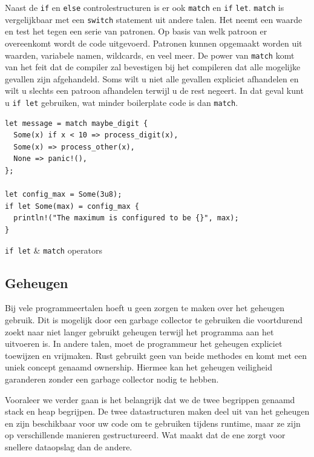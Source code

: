 Naast de \texttt{if} en \texttt{else} controlestructuren is er ook
\texttt{match} en \texttt{if} \texttt{let}. \texttt{match}
is vergelijkbaar met een \texttt{switch} statement uit andere talen. Het neemt een
waarde en test het tegen een serie van patronen. Op basis van welk patroon er overeenkomt wordt de
code uitgevoerd. Patronen kunnen opgemaakt worden uit waarden, variabele namen, wildcards, en veel
meer. De power van \texttt{match} komt van het feit dat de compiler zal bevestigen bij het
compileren dat alle mogelijke gevallen zijn afgehandeld. Soms wilt u niet alle gevallen expliciet
afhandelen en wilt u slechts een patroon afhandelen terwijl u de rest negeert. In dat geval kunt u
\texttt{if let} gebruiken, wat minder boilerplate code is dan \texttt{match}.

\begin{listing}[h]
\begin{verbatim}
let message = match maybe_digit {
  Some(x) if x < 10 => process_digit(x),
  Some(x) => process_other(x),
  None => panic!(),
};

let config_max = Some(3u8);
if let Some(max) = config_max {
  println!("The maximum is configured to be {}", max);
}
\end{verbatim}
\caption{\texttt{if let} \& \texttt{match} operators}
\end{listing}

\clearpage

\subsection{Geheugen}

Bij vele programmeertalen hoeft u geen zorgen te maken over het geheugen gebruik. Dit is mogelijk
door een garbage collector te gebruiken die voortdurend zoekt naar niet langer gebruikt geheugen
terwijl het programma aan het uitvoeren is. In andere talen, moet de programmeur het geheugen
expliciet toewijzen en vrijmaken. Rust gebruikt geen van beide methodes en komt met een uniek
concept genaamd ownership. Hiermee kan het geheugen veiligheid garanderen zonder een garbage
collector nodig te hebben.
\cite{ownership}

Vooraleer we verder gaan is het belangrijk dat we de twee begrippen genaamd stack en heap begrijpen.
De twee datastructuren maken deel uit van het geheugen en zijn beschikbaar voor uw code om te
gebruiken tijdens runtime, maar ze zijn op verschillende manieren gestructureerd. Wat maakt dat de
ene zorgt voor snellere dataopslag dan de andere. 

